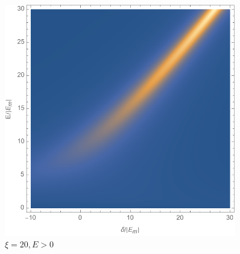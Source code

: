 \documentclass{article}
\theoremstyle{definition}
\begin{document}
\begin{enumerate}[label=(\alph*)]
\begin{figure}[!htb]
\begin{minipage}{0.3\textwidth}
\caption{$\xi = 8, E > 0$}
\end{minipage}
\begin{minipage}{0.3\textwidth}
\includegraphics[width=0.9\textwidth]{UmE_density_plot_20.png}
\caption{$\xi = 20, E > 0 $}
\end{minipage}
\end{figure}


\end{enumerate}
\end{document}
